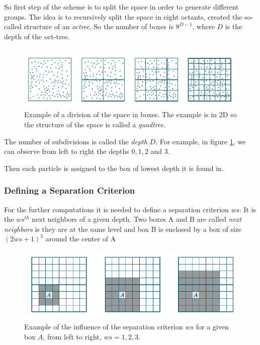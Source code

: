 \documentclass[12pt,twoside,a4paper]{report}
\begin{document}
	So first step of the scheme is to split the space in order to generate different groups. The idea is to recursively split the space in eight octants, created the so-called structure of an \textit{octree}. So the number of boxes is $8^{D-1}$, where $D$ is the depth of the oct-tree.
	
		
	
	\begin{figure}[H]
	    
    \includegraphics[scale=0.9]{BoxDepth}    
    \centering 
    \caption{Example of a division of the space in boxes. The  example is in 2D so the structure of the space is called a \textit{quadtree}.}
    \label{fig:depth}       
     \end{figure}
	
    
    The number of subdivisions is called the \textit{depth} $D$. For example, in figure \ref{fig:depth}, we can observe from left to right the depths $0,1,2$ and $3$.
    
    Then each particle is assigned  to the box of lowest depth it is found in.
    
	\subsubsection{Defining a Separation Criterion}
	
	For the further computations it is needed to define a separation criterion $ws$: It is the $ws^{th}$ next neighbors of a given depth. Two boxes A and B are called \textit{next neighbors} is they are at the same level and box B is enclosed by a box of size $(2 ws + 1)^3$ around the center of A 
	
	
	
	
	\begin{figure}[H]
    \includegraphics[scale=0.7]{separation}    
    \centering 
    \caption{Example of the influence of the separation criterion $ws$ for a given box $A$, from left to right, $ws = 1,2,3$.}    
    \label{fig:separation}
     \end{figure}
	
\end{document}
